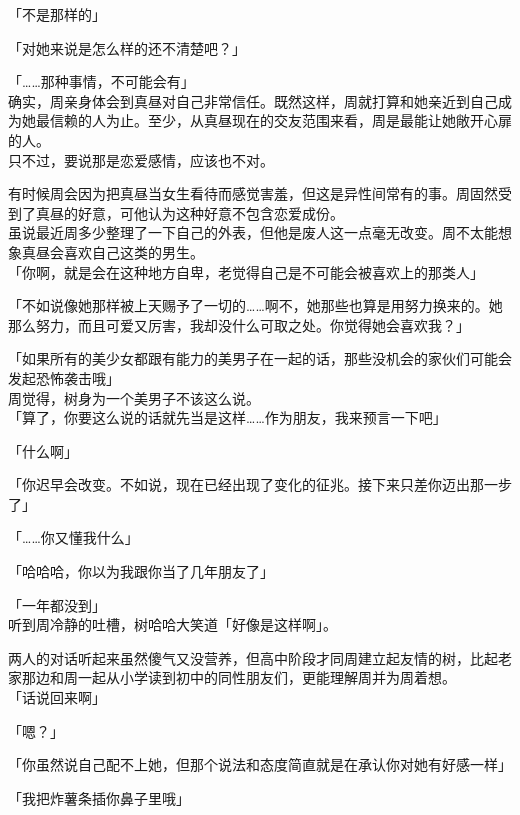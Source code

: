 「不是那样的」

「对她来说是怎么样的还不清楚吧？」

「……那种事情，不可能会有」\\

确实，周亲身体会到真昼对自己非常信任。既然这样，周就打算和她亲近到自己成为她最信赖的人为止。至少，从真昼现在的交友范围来看，周是最能让她敞开心扉的人。\\

只不过，要说那是恋爱感情，应该也不对。

有时候周会因为把真昼当女生看待而感觉害羞，但这是异性间常有的事。周固然受到了真昼的好意，可他认为这种好意不包含恋爱成份。\\

虽说最近周多少整理了一下自己的外表，但他是废人这一点毫无改变。周不太能想象真昼会喜欢自己这类的男生。\\

「你啊，就是会在这种地方自卑，老觉得自己是不可能会被喜欢上的那类人」

「不如说像她那样被上天赐予了一切的……啊不，她那些也算是用努力换来的。她那么努力，而且可爱又厉害，我却没什么可取之处。你觉得她会喜欢我？」

「如果所有的美少女都跟有能力的美男子在一起的话，那些没机会的家伙们可能会发起恐怖袭击哦」\\

周觉得，树身为一个美男子不该这么说。\\

「算了，你要这么说的话就先当是这样……作为朋友，我来预言一下吧」

「什么啊」

「你迟早会改变。不如说，现在已经出现了变化的征兆。接下来只差你迈出那一步了」

「……你又懂我什么」

「哈哈哈，你以为我跟你当了几年朋友了」

「一年都没到」\\

听到周冷静的吐槽，树哈哈大笑道「好像是这样啊」。

两人的对话听起来虽然傻气又没营养，但高中阶段才同周建立起友情的树，比起老家那边和周一起从小学读到初中的同性朋友们，更能理解周并为周着想。\\

「话说回来啊」

「嗯？」

「你虽然说自己配不上她，但那个说法和态度简直就是在承认你对她有好感一样」

「我把炸薯条插你鼻子里哦」

